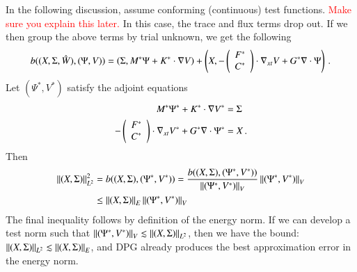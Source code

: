 \documentclass[preprint,12pt]{elsarticle}
\begin{document}
In the following discussion, assume conforming (continuous) test functions. 
\textcolor{red}{Make sure you explain this later.}
In this case, the trace and flux terms drop out.
If we then group the above terms by trial unknown, we get the following
\begin{align*}
b((X,\Sigma,\hat W),(\Psi,V))=
\left( \Sigma,M^*\Psi
+K^*\cdot\nabla V \right)
+\left( X,-\left( \begin{array}{c} F^*\\ C^*\\ \end{array} \right)\cdot\nabla_{xt} V
+G^*\nabla\cdot\Psi \right)\,.
\end{align*}
Let $(\Psi^*,V^*)$ satisfy the adjoint equations
\begin{align*}
\label{eq:abstractAdjoint}
M^*\Psi^*+K^*\cdot\nabla V^*&=\Sigma\\
-\left( \begin{array}{c} F^*\\ C^*\\ \end{array} \right)\cdot\nabla_{xt} V^*+G^*\nabla\cdot\Psi^*&=X\,.
\end{align*}
Then
\begin{align*}
\left\| (X,\Sigma) \right\|_{L^2}^2
&=b((X,\Sigma),(\Psi^*,V^*))
=\frac{b((X,\Sigma),(\Psi^*,V^*))}{\left\| (\Psi^*,V^*) \right\|_V}\left\| (\Psi^*,V^*) \right\|_V\\
&\leq\left\| (X,\Sigma) \right\|_E\left\| (\Psi^*,V^*) \right\|_V
\end{align*}
The final inequality follows by definition of the energy norm.
If we can develop a test norm such that $\left\| (\Psi^*,V^*) \right\|_V\lesssim\left\| (X,\Sigma) \right\|_{L^2}$,
then we have the bound: $\left\| (X,\Sigma) \right\|_{L^2}\lesssim\left\| (X,\Sigma) \right\|_E$, and DPG already produces the best approximation 
error in the energy norm.
\end{document}
